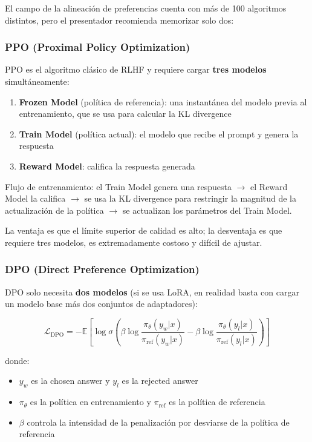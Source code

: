 \documentclass[a4paper]{article}
\begin{document}
El campo de la alineación de preferencias cuenta con más de 100 algoritmos distintos, pero el presentador recomienda memorizar solo dos:

\subsubsection{PPO (Proximal Policy Optimization)}

PPO es el algoritmo clásico de RLHF y requiere cargar \textbf{tres modelos} simultáneamente:

\begin{enumerate}
    \item \textbf{Frozen Model} (política de referencia): una instantánea del modelo previa al entrenamiento, que se usa para calcular la KL divergence
    \item \textbf{Train Model} (política actual): el modelo que recibe el prompt y genera la respuesta
    \item \textbf{Reward Model}: califica la respuesta generada
\end{enumerate}

Flujo de entrenamiento: el Train Model genera una respuesta $\rightarrow$ el Reward Model la califica $\rightarrow$ se usa la KL divergence para restringir la magnitud de la actualización de la política $\rightarrow$ se actualizan los parámetros del Train Model.

La ventaja es que el límite superior de calidad es alto; la desventaja es que requiere tres modelos, es extremadamente costoso y difícil de ajustar.

\subsubsection{DPO (Direct Preference Optimization)}

DPO solo necesita \textbf{dos modelos} (si se usa LoRA, en realidad basta con cargar un modelo base más dos conjuntos de adaptadores):

$$\mathcal{L}_{\text{DPO}} = -\mathbb{E}\left[\log \sigma\left(\beta \log \frac{\pi_\theta(y_w|x)}{\pi_{\text{ref}}(y_w|x)} - \beta \log \frac{\pi_\theta(y_l|x)}{\pi_{\text{ref}}(y_l|x)}\right)\right]$$

donde:
\begin{itemize}
    \item $y_w$ es la chosen answer y $y_l$ es la rejected answer
    \item $\pi_\theta$ es la política en entrenamiento y $\pi_{\text{ref}}$ es la política de referencia
    \item $\beta$ controla la intensidad de la penalización por desviarse de la política de referencia
\end{itemize}
\end{document}
